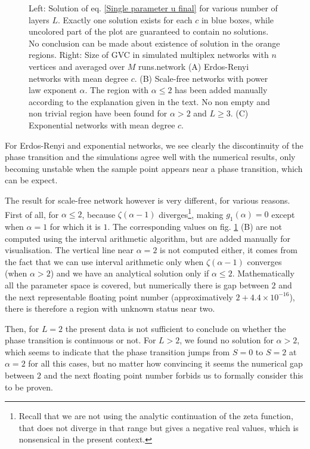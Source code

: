 \documentclass[
11pt, %
english, %
singlespacing, %
nolistspacing, %
liststotoc, %
headsepline, %
]{MastersDoctoralThesis} %
\begin{document}
{\begin{figure}
	\caption{Left: Solution of eq. \eqref{Single parameter u final} for various number of layers $L$. Exactly one solution exists for each $c$ in blue boxes, while uncolored part of the plot are guaranteed to contain no solutions. No conclusion can be made about existence of solution in the orange regions. Right: Size of GVC in simulated multiplex networks with $n$ vertices and averaged over $M$ runs.network (A) Erdos-Renyi networks with mean degree $c$. (B) Scale-free networks with power law exponent $\alpha$. The region with $\alpha \leq 2$ has been added manually according to the explanation given in the text. No non empty and non trivial region have been found for $\alpha > 2$ and $L \geq 3$. (C) Exponential networks with mean degree $c$.}
	\label{Figure: Multilayer single parameter}
\end{figure}
}

For Erdos-Renyi and exponential networks, we see clearly the discontinuity of the phase transition and the simulations agree well with the numerical results, only becoming unstable when the sample point appears near a phase transition, which can be expect.

The result for scale-free network however is very different, for various reasons. First of all, for $\alpha \leq 2$, because $\zeta(\alpha - 1)$ diverges\footnote{Recall that we are not using the analytic continuation of the zeta function, that does not diverge in that range but gives a negative real values, which is nonsensical in the present context.}, making $g_1(\alpha) = 0$ except when $\alpha = 1$ for which it is $1$. The corresponding values on fig. \ref{Figure: Multilayer single parameter} (B) are not computed using the interval arithmetic algorithm, but are added manually for visualisation. The vertical line near $\alpha = 2$ is not computed either, it comes from the fact that we can use interval arithmetic only when $\zeta(\alpha - 1)$ converges (when $\alpha > 2$) and we have an analytical solution only if $\alpha \leq 2$. Mathematically all the parameter space is covered, but numerically there is gap between $2$ and the next representable floating point number (approximatively $2 + 4.4 \times 10^{-16}$), there is therefore a region with unknown status near two.

Then, for $L = 2$ the present data is not sufficient to conclude on whether the phase transition is continuous or not. For $L > 2$, we found no solution for $\alpha > 2$, which seems to indicate that the phase transition jumps from $S = 0$ to $S = 2$ at $\alpha = 2$ for all this cases, but no matter how convincing it seems the numerical gap between $2$ and the next floating point number forbids us to formally consider this to be proven.
\end{document}
